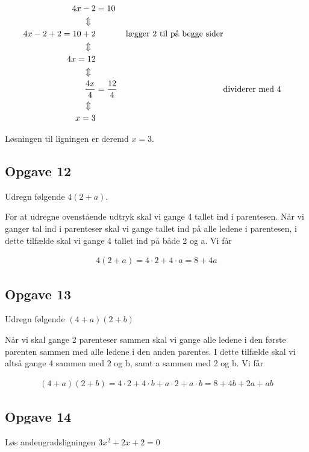 \begin{align*}
4x - 2 &= 10\\
\Updownarrow\hspace*{2mm} &\\
4x - 2 + 2 = 10 + 2 && \text{lægger 2 til på begge sider}\\
\Updownarrow\hspace*{2mm} &\\
4x = 12\\
\Updownarrow\hspace*{2mm} &\\
\frac{4x}{4} &= \frac{12}{4} &&\text{dividerer med 4}\\
\Updownarrow\hspace*{2mm} &\\
x = 3
\end{align*}

Løsningen til ligningen er deremd $x = 3$.

\subsection{Opgave 12}

Udregn følgende $4(2+a)$.

For at udregne ovenstående udtryk skal vi gange 4 tallet ind i parentesen. Når vi ganger tal ind i parenteser skal vi gange tallet ind på alle ledene i parentesen, i dette tilfælde skal vi gange 4 tallet ind på både 2 og a. Vi får

\begin{align*}
4(2+a) = 4\cdot 2 + 4\cdot a = 8 + 4a
\end{align*}

\subsection{Opgave 13}
Udregn følgende $(4+a)(2+b)$

Når vi skal gange 2 parenteser sammen skal vi gange alle ledene i den første parenten sammen med alle ledene i den anden parentes. I dette tilfælde skal vi altså gange 4 sammen med 2 og b, samt a sammen med 2 og b. Vi får

\begin{align*}
(4+a)(2+b) = 4\cdot 2 + 4\cdot b + a\cdot 2 + a\cdot b = 8 +4b + 2a + ab
\end{align*}

\subsection{Opgave 14}
Løs andengradsligningen $3x^2 +2x +2 = 0$

